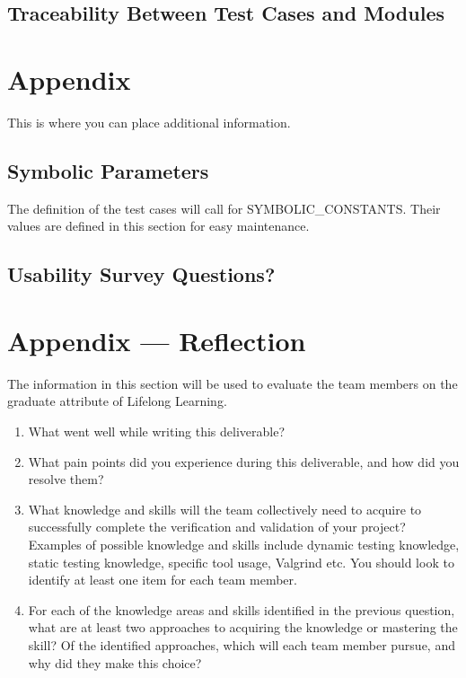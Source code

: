 \documentclass[12pt, titlepage]{article}
\begin{document}
\subsection{Traceability Between Test Cases and Modules}

				




\newpage

\section{Appendix}

This is where you can place additional information.

\subsection{Symbolic Parameters}

The definition of the test cases will call for SYMBOLIC\_CONSTANTS.  Their
values are defined in this section for easy maintenance.

\subsection{Usability Survey Questions?}


\newpage{}
\section*{Appendix --- Reflection}


The information in this section will be used to evaluate the team members on the
graduate attribute of Lifelong Learning.



\begin{enumerate}
  \item What went well while writing this deliverable? 
  \item What pain points did you experience during this deliverable, and how did
    you resolve them?
  \item What knowledge and skills will the team collectively need to acquire to
  successfully complete the verification and validation of your project?
  Examples of possible knowledge and skills include dynamic testing knowledge,
  static testing knowledge, specific tool usage, Valgrind etc.  You should look
  to identify at least one item for each team member.
  \item For each of the knowledge areas and skills identified in the previous
  question, what are at least two approaches to acquiring the knowledge or
  mastering the skill?  Of the identified approaches, which will each team
  member pursue, and why did they make this choice?
\end{enumerate}
\end{document}
